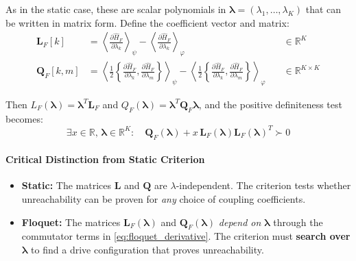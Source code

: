 As in the static case, these are scalar polynomials in $\boldsymbol{\lambda} = (\lambda_1, \ldots, \lambda_K)$ that can be written in matrix form. Define the coefficient vector and matrix:
\begin{align}
\mathbf{L}_F[k] &= \left\langle \frac{\partial \hat{H}_F}{\partial \lambda_k} \right\rangle_\psi - \left\langle \frac{\partial \hat{H}_F}{\partial \lambda_k} \right\rangle_\varphi \quad &\in \mathbb{R}^K \\
\mathbf{Q}_F[k,m] &= \left\langle \frac{1}{2}\left\{\frac{\partial \hat{H}_F}{\partial \lambda_k}, \frac{\partial \hat{H}_F}{\partial \lambda_m}\right\} \right\rangle_\psi - \left\langle \frac{1}{2}\left\{\frac{\partial \hat{H}_F}{\partial \lambda_k}, \frac{\partial \hat{H}_F}{\partial \lambda_m}\right\} \right\rangle_\varphi \quad &\in \mathbb{R}^{K \times K}
\end{align}

Then $L_F(\boldsymbol{\lambda}) = \boldsymbol{\lambda}^T \mathbf{L}_F$ and $Q_F(\boldsymbol{\lambda}) = \boldsymbol{\lambda}^T \mathbf{Q}_F \boldsymbol{\lambda}$, and the positive definiteness test becomes:
\begin{equation}
\boxed{
\exists x \in \mathbb{R}, \, \boldsymbol{\lambda} \in \mathbb{R}^K : \quad \mathbf{Q}_F(\boldsymbol{\lambda}) + x \, \mathbf{L}_F(\boldsymbol{\lambda}) \mathbf{L}_F(\boldsymbol{\lambda})^T \succ 0
}
\label{eq:floquet_criterion_matrix}
\end{equation}

\paragraph{Critical Distinction from Static Criterion}

\begin{itemize}
\item \textbf{Static:} The matrices $\mathbf{L}$ and $\mathbf{Q}$ are $\lambda$-independent. The criterion tests whether unreachability can be proven for \emph{any} choice of coupling coefficients.

\item \textbf{Floquet:} The matrices $\mathbf{L}_F(\boldsymbol{\lambda})$ and $\mathbf{Q}_F(\boldsymbol{\lambda})$ \emph{depend on} $\boldsymbol{\lambda}$ through the commutator terms in \cref{eq:floquet_derivative}. The criterion must \textbf{search over $\boldsymbol{\lambda}$} to find a drive configuration that proves unreachability.
\end{itemize}

